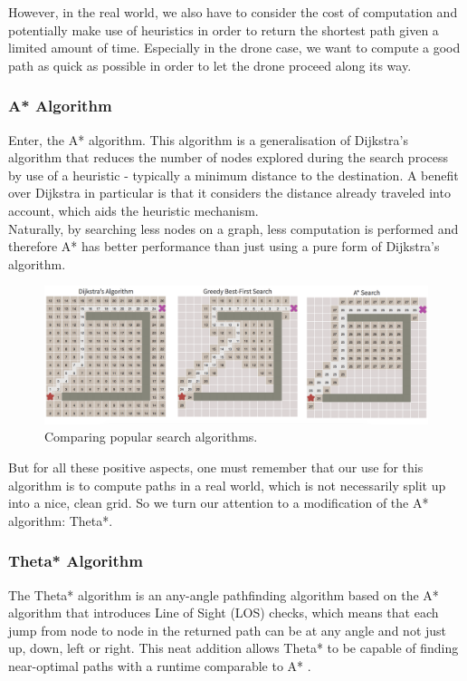 \documentclass[a4paper,12pt,titlepage]{article}
\begin{document}
However, in the real world, we also have to consider the cost of computation and potentially make use of heuristics in order to return the shortest path given a limited amount of time. Especially in the drone case, we want to compute a good path as quick as possible in order to let the drone proceed along its way.

\subsubsection{A* Algorithm}
Enter, the A* algorithm. This algorithm is a generalisation of Dijkstra's algorithm that reduces the number of nodes explored during the search process by use of a heuristic - typically a minimum distance to the destination. A benefit over Dijkstra in particular is that it considers the distance already traveled into account, which aids the heuristic mechanism. \\

Naturally, by searching less nodes on a graph, less computation is performed and therefore A* has better performance than just using a pure form of Dijkstra's algorithm.

\begin{figure}[!hbpt]
  \center
  \includegraphics[width=\linewidth]{img/search_comparison.png}
  \caption{Comparing popular search algorithms. \cite{Balaji2017}}
  \label{fig:search_comparison}
\end{figure}

But for all these positive aspects, one must remember that our use for this algorithm is to compute paths in a real world, which is not necessarily split up into a nice, clean grid. So we turn our attention to a modification of the A* algorithm: Theta*.

\subsubsection{Theta* Algorithm}
The Theta* algorithm is an any-angle pathfinding algorithm based on the A* algorithm that introduces Line of Sight (LOS) checks, which means that each jump from node to node in the returned path can be at any angle and not just up, down, left or right. This neat addition allows Theta* to be capable of finding near-optimal paths with a runtime comparable to A* \cite{Uras2015}. \\
\end{document}
